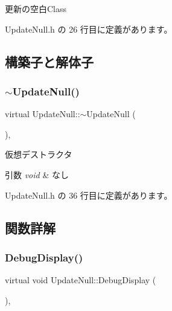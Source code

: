 更新の空白\+Class 

 Update\+Null.\+h の 26 行目に定義があります。



\subsection{構築子と解体子}
\mbox{\label{class_update_null_a121a3045119935eb2704ef282bba2f9f}} 
\subsubsection{\texorpdfstring{$\sim$\+Update\+Null()}{~UpdateNull()}}
{\footnotesize\ttfamily virtual Update\+Null\+::$\sim$\+Update\+Null (\begin{DoxyParamCaption}{ }\end{DoxyParamCaption})\hspace{0.3cm}{\ttfamily [inline]}, {\ttfamily [virtual]}}



仮想デストラクタ 


\begin{DoxyParams}{引数}
{\em void} & なし \\
\hline
\end{DoxyParams}


 Update\+Null.\+h の 36 行目に定義があります。



\subsection{関数詳解}
\mbox{\label{class_update_null_a77aee1e614cf6dafe4f9af58b2205e4b}} 
\subsubsection{\texorpdfstring{Debug\+Display()}{DebugDisplay()}}
{\footnotesize\ttfamily virtual void Update\+Null\+::\+Debug\+Display (\begin{DoxyParamCaption}{ }\end{DoxyParamCaption})\hspace{0.3cm}{\ttfamily [inline]}, {\ttfamily [virtual]}}



